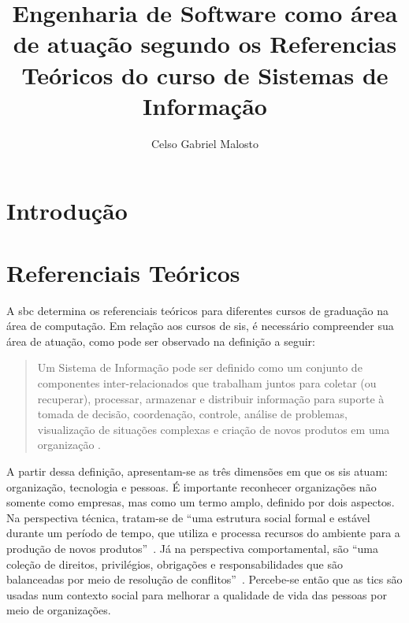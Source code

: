 \documentclass[12pt]{article}
\title{Engenharia de Software como área de atuação segundo os Referencias Teóricos do curso de Sistemas de Informação}
\author{Celso Gabriel Malosto\inst{1}}
\begin{document}
\maketitle

\begin{abstract}

\end{abstract}

\begin{resumo}

\end{resumo}

\section{Introdução}%
\label{sec:introducao}

\section{Referenciais Teóricos}%
\label{sec:referenciais_teoricos}

A \gls{sbc} determina os referenciais teóricos para diferentes cursos de graduação na área de computação.
Em relação aos cursos de \glspl{si}, é necessário compreender sua área de atuação, como pode ser observado na definição a seguir:

\begin{quote}
    Um Sistema de Informação pode ser definido como um conjunto de componentes
    inter-relacionados que trabalham juntos para coletar (ou recuperar), processar, armazenar e distribuir
    informação para suporte à tomada de decisão, coordenação, controle, análise de problemas, visualização de
    situações complexas e criação de novos produtos em uma organização .
\end{quote}

A partir dessa definição, apresentam-se as três dimensões em que os \glspl{si} atuam: organização, tecnologia e pessoas.
É importante reconhecer organizações não somente como empresas, mas como um termo amplo, definido por dois aspectos.
Na perspectiva técnica, tratam-se de ``uma estrutura social formal e estável durante um período de tempo, que utiliza e processa recursos do ambiente para a produção de novos produtos''~\cite{zorzo2017referenciais}.
Já na perspectiva comportamental, são ``uma coleção de direitos, privilégios, obrigações e responsabilidades que são balanceadas por meio de resolução de conflitos''~\cite{zorzo2017referenciais}.
Percebe-se então que as \glspl{tic} são usadas num contexto social para melhorar a qualidade de vida das pessoas por meio de organizações.
\end{document}
